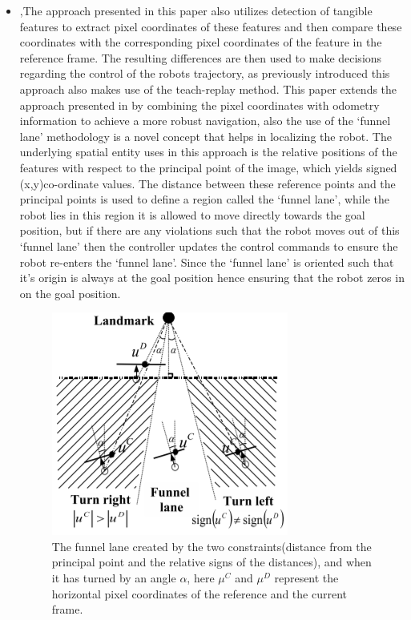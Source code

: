 \begin{itemize}
	\item \cite{chen2009qualitative},The approach presented in this paper also utilizes detection of tangible features to extract pixel coordinates of these features and then compare these coordinates with the corresponding pixel coordinates of the feature in the reference frame. The resulting differences are then used to make decisions regarding the control of the robots trajectory, as previously introduced this approach also makes use of the teach-replay method. This paper extends the approach presented in \cite{chen2006qualitative} by combining the pixel coordinates with odometry information to achieve a more robust navigation, also the use of the `funnel lane' methodology is a novel concept that helps in localizing the robot. The underlying spatial entity uses in this approach is the relative positions of the features with respect to the principal point of the image, which yields signed (x,y)co-ordinate values. The distance between these reference points and the principal points is used to define a region called the `funnel lane', while the robot lies in this region it is allowed to move directly towards the goal position, but if there are any violations such that the robot moves out of this `funnel lane' then the controller updates the control commands to ensure the robot re-enters the `funnel lane'. Since the `funnel lane' is oriented such that it's origin is always at the goal position hence ensuring that the robot zeros in on the goal position.
	\begin{figure}[h]
		\centering
		\includegraphics[scale=1]{images/funnel_lane}
		\caption{The funnel lane created by the two constraints(distance from the principal point and the relative signs of the distances), and when it has turned by an angle $\alpha$, here $\mu^C$  and  $\mu^D$ represent the horizontal pixel coordinates of the reference and the current frame.}
		\label{fig:funnellane}
	\end{figure}
	

\end{itemize}
